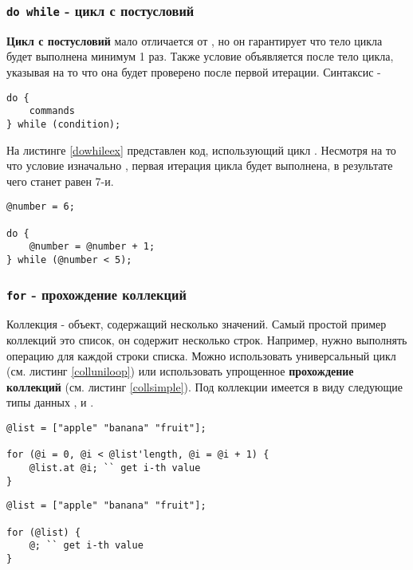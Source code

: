 \documentclass[a4paper, 14pt]{extarticle}
\begin{document}
\subsubsection{\lstinline`do while` - цикл с постусловий}

{\bf Цикл с постусловий} мало отличается от , но он гарантирует что тело цикла будет выполнена минимум 1 раз. Также условие объявляется после тело цикла, указывая на то что она будет проверено после первой итерации. Синтаксис -
\begin{lstlisting}[numbers=none]
do {
	commands
} while (condition);
\end{lstlisting}

На листинге \ref{dowhileex} представлен код, использующий цикл . Несмотря на то что условие изначально , первая итерация цикла будет выполнена, в результате чего  станет равен 7-и.

\begin{lstlisting}[caption=Цикл do while, label=dowhileex]
@number = 6;

do {
	@number = @number + 1;
} while (@number < 5);
\end{lstlisting}

\subsubsection{\lstinline`for` - прохождение коллекций}

{Коллекция} - объект, содержащий несколько значений. Самый простой пример коллекций это список, он содержит несколько строк. Например, нужно выполнять операцию для каждой строки списка. Можно использовать универсальный цикл (см. листинг \ref{colluniloop}) или использовать упрощенное {\bf прохождение коллекций} (см. листинг \ref{collsimple}). Под коллекции имеется в виду следующие типы данных ,  и .
\begin{lstlisting}[caption=Прохождение коллекций с помощью универсального цикла, label=colluniloop]
@list = ["apple" "banana" "fruit"];

for (@i = 0, @i < @list'length, @i = @i + 1) {
	@list.at @i; `` get i-th value
}
\end{lstlisting}

\begin{lstlisting}[caption=Упрощённое прохождение коллекций, label=collsimple]
@list = ["apple" "banana" "fruit"];

for (@list) {
	@; `` get i-th value
}
\end{lstlisting}
\end{document}
